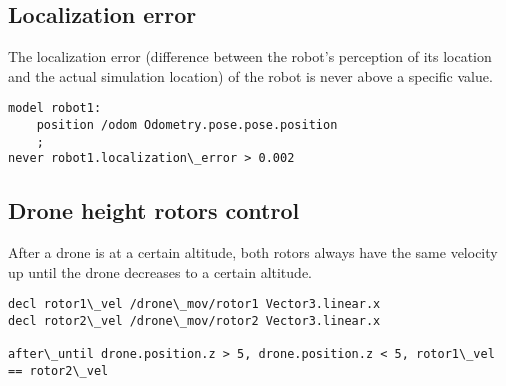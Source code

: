 \subsection{Localization error}
\label{ssec:localizationexample}

The localization error (difference between the robot's perception of its location and the actual simulation location) of the robot is never above a specific value.

\begin{lstlisting}
model robot1:
    position /odom Odometry.pose.pose.position
    ;
never robot1.localization\_error > 0.002
\end{lstlisting}


\subsection{Drone height rotors control}
\label{ssec:rotorsexample}

After a drone is at a certain altitude, both rotors always have the same velocity up until the drone decreases to a certain altitude.

\begin{lstlisting}
decl rotor1\_vel /drone\_mov/rotor1 Vector3.linear.x
decl rotor2\_vel /drone\_mov/rotor2 Vector3.linear.x

after\_until drone.position.z > 5, drone.position.z < 5, rotor1\_vel == rotor2\_vel
\end{lstlisting}
